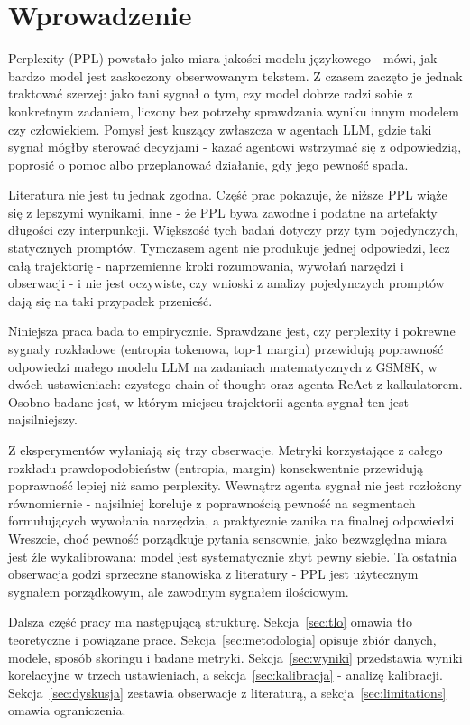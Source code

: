 
\section{Wprowadzenie}
\label{sec:wprowadzenie}

Perplexity (PPL) powstało jako miara jakości modelu językowego -
mówi, jak bardzo model jest zaskoczony obserwowanym tekstem. Z
czasem zaczęto je jednak traktować szerzej: jako tani sygnał o tym,
czy model dobrze radzi sobie z konkretnym zadaniem, liczony bez
potrzeby sprawdzania wyniku innym modelem czy człowiekiem. Pomysł
jest kuszący zwłaszcza w agentach LLM, gdzie taki sygnał mógłby
sterować decyzjami - kazać agentowi wstrzymać się z odpowiedzią,
poprosić o pomoc albo przeplanować działanie, gdy jego pewność spada.

Literatura nie jest tu jednak zgodna. Część prac pokazuje, że niższe
PPL wiąże się z lepszymi wynikami, inne - że PPL bywa zawodne i
podatne na artefakty długości czy interpunkcji. Większość tych badań
dotyczy przy tym pojedynczych, statycznych promptów. Tymczasem
agent nie produkuje jednej odpowiedzi, lecz całą trajektorię -
naprzemienne kroki rozumowania, wywołań narzędzi i obserwacji - i nie
jest oczywiste, czy wnioski z analizy pojedynczych promptów dają się
na taki przypadek przenieść.

Niniejsza praca bada to empirycznie. Sprawdzane jest, czy perplexity
i pokrewne sygnały rozkładowe (entropia tokenowa, top-1 margin)
przewidują poprawność odpowiedzi małego modelu LLM na zadaniach
matematycznych z GSM8K, w dwóch ustawieniach: czystego
chain-of-thought oraz agenta ReAct z kalkulatorem. Osobno badane
jest, w którym miejscu trajektorii agenta sygnał ten jest
najsilniejszy.

Z eksperymentów wyłaniają się trzy obserwacje. Metryki korzystające
z całego rozkładu prawdopodobieństw (entropia, margin) konsekwentnie
przewidują poprawność lepiej niż samo perplexity. Wewnątrz agenta
sygnał nie jest rozłożony równomiernie - najsilniej koreluje z
poprawnością pewność na segmentach formułujących wywołania narzędzia,
a praktycznie zanika na finalnej odpowiedzi. Wreszcie, choć pewność
porządkuje pytania sensownie, jako bezwzględna miara jest źle
wykalibrowana: model jest systematycznie zbyt pewny siebie. Ta ostatnia
obserwacja godzi sprzeczne stanowiska z literatury - PPL jest
użytecznym sygnałem porządkowym, ale zawodnym sygnałem ilościowym.

Dalsza część pracy ma następującą strukturę. Sekcja~\ref{sec:tlo}
omawia tło teoretyczne i powiązane prace. Sekcja~\ref{sec:metodologia}
opisuje zbiór danych, modele, sposób skoringu i badane metryki.
Sekcja~\ref{sec:wyniki} przedstawia wyniki korelacyjne w trzech
ustawieniach, a sekcja~\ref{sec:kalibracja} - analizę kalibracji.
Sekcja~\ref{sec:dyskusja} zestawia obserwacje z literaturą, a
sekcja~\ref{sec:limitations} omawia ograniczenia.
